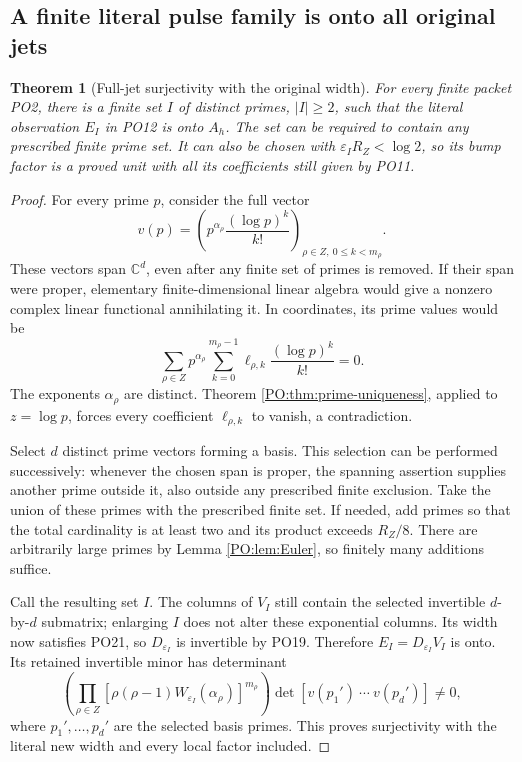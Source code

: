 \documentclass[11pt,a4paper]{article}
\newtheorem{theorem}{Theorem}[section]
\theoremstyle{definition}\newtheorem{definition}[theorem]{Definition}
\newcommand{\C}{\mathbb C}\newcommand{\R}{\mathbb R}
\begin{document}
\subsection{A finite literal pulse family is onto all original jets}

\begin{theorem}[Full-jet surjectivity with the original width]
\label{PO:thm:onto}
For every finite packet PO2, there is a finite set \(I\) of
distinct primes, \(|I|\ge2\), such that the literal observation
\(E_I\) in PO12 is onto \(A_h\).
The set can be required to contain any prescribed finite prime
set. It can also be chosen with
\(\varepsilon_I R_Z<\log2\), so its bump factor is a proved unit
with all its coefficients still given by PO11.
\end{theorem}
\begin{proof}
For every prime \(p\), consider the full vector
\[
 v(p)=
 \left(p^{\alpha_\rho}
            \frac{(\log p)^k}{k!}\right)_{\rho\in Z,\ 0\le k<m_\rho}.
 \tag{PO27}\label{PO:po:prime-columns}
\]
These vectors span \(\C^d\), even after any finite set of
primes is removed. If their span were proper, elementary
finite-dimensional linear algebra would give a nonzero
complex linear functional annihilating it. In coordinates,
its prime values would be
\[
 \sum_{\rho\in Z}p^{\alpha_\rho}
       \sum_{k=0}^{m_\rho-1}\ell_{\rho,k}
                           \frac{(\log p)^k}{k!}=0 .
 \tag{PO28}
\]
The exponents \(\alpha_\rho\) are distinct. Theorem
\ref{PO:thm:prime-uniqueness}, applied to \(z=\log p\), forces
every coefficient \(\ell_{\rho,k}\) to vanish, a contradiction.

Select \(d\) distinct prime vectors forming a basis. This
selection can be performed successively: whenever the
chosen span is proper, the spanning assertion supplies
another prime outside it, also outside any prescribed finite
exclusion. Take the union of these primes with the prescribed
finite set. If needed, add primes so that the total cardinality
is at least two and its product exceeds \(R_Z/8\). There
are arbitrarily large primes by Lemma \ref{PO:lem:Euler}, so
finitely many additions suffice.

Call the resulting set \(I\). The columns of \(V_I\) still
contain the selected invertible \(d\)-by-\(d\) submatrix;
enlarging \(I\) does not alter these exponential columns.
Its width now satisfies PO21, so \(D_{\varepsilon_I}\) is
invertible by PO19. Therefore \(E_I=D_{\varepsilon_I}V_I\) is
onto. Its retained invertible minor has determinant
\[
 \left(\prod_{\rho\in Z}
 [\rho(\rho-1)W_{\varepsilon_I}(\alpha_\rho)]^{m_\rho}\right)
       \det[v(p_1')\ \cdots\ v(p_d')]\ne0,
 \tag{PO29}\label{PO:po:minor}
\]
where \(p_1',\ldots,p_d'\) are the selected basis primes.
This proves surjectivity with the literal new width and every
local factor included.
\end{proof}
\end{document}
